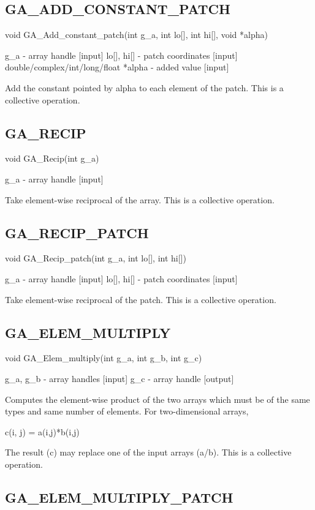 \subsection*{GA\_ADD\_CONSTANT\_PATCH}

void GA\_Add\_constant\_patch(int g\_a, int lo{[}{]}, int hi{[}{]},
void {*}alpha)

g\_a - array handle {[}input{]} lo{[}{]}, hi{[}{]} - patch coordinates
{[}input{]} double/complex/int/long/float {*}alpha - added value {[}input{]}

Add the constant pointed by alpha to each element of the patch. This
is a collective operation. 


\subsection*{GA\_RECIP}

void GA\_Recip(int g\_a)

g\_a - array handle {[}input{]}

Take element-wise reciprocal of the array. This is a collective operation.


\subsection*{GA\_RECIP\_PATCH}

void GA\_Recip\_patch(int g\_a, int lo{[}{]}, int hi{[}{]})

g\_a - array handle {[}input{]} lo{[}{]}, hi{[}{]} - patch coordinates
{[}input{]}

Take element-wise reciprocal of the patch. This is a collective operation. 


\subsection*{GA\_ELEM\_MULTIPLY}

void GA\_Elem\_multiply(int g\_a, int g\_b, int g\_c)

g\_a, g\_b - array handles {[}input{]} g\_c - array handle {[}output{]}

Computes the element-wise product of the two arrays which must be
of the same types and same number of elements. For two-dimensional
arrays,

c(i, j) = a(i,j){*}b(i,j)

The result (c) may replace one of the input arrays (a/b). This is
a collective operation. 


\subsection*{GA\_ELEM\_MULTIPLY\_PATCH}

